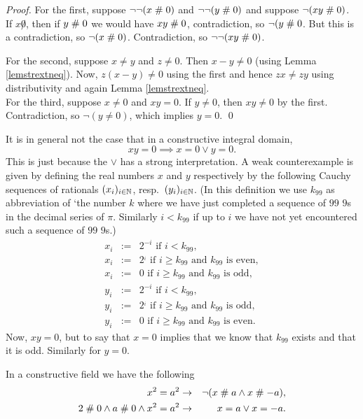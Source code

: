 \begin{proof}
For the first, suppose $\neg\neg(x\mathrel{\#} 0)$ and $\neg\neg(y\mathrel{\#} 0)$
and suppose $\neg(x y\mathrel{\#} 0)$. If $x\not 0$, then if $y\mathrel{\#} 0$ we
would have $x y \mathrel{\#} 0$, contradiction, so $\neg(y\mathrel{\#} 0$. But this
is a contradiction, so $\neg(x\mathrel{\#} 0)$. Contradiction, so 
$\neg\neg(x y\mathrel{\#} 0)$.

For the second, suppose $x\neq y$ and $z\neq 0$. Then $x-y \neq 0$
(using Lemma \ref{lemstrextneq}). Now, $z (x-y) \neq 0$ using the
first and hence $z x \neq z y$ using distributivity and again Lemma
\ref{lemstrextneq}.\\ For the third, suppose $x\neq 0$ and $x y=0$. If
$y\neq 0$, then $x y \neq 0$ by the first. Contradiction, so
$\neg(y\neq 0)$, which implies $y=0$. \qed
\end{proof}

\begin{remark}
  It is in general not the case that in a constructive integral
  domain,
$$xy = 0 \implies x =0 \vee y =0.$$
This is just because the $\vee$ has a strong interpretation. A weak
counterexample is given by defining the real numbers $x$ and $y$
respectively by the following Cauchy sequences of rationals
$(x_i)_{i\in\mathbb{N}}$, resp.\ $(y_i)_{i\in\mathbb{N}}$.
(In this definition we use  $k_{99}$ as abbreviation of `the number
$k$ where we have just completed a sequence of 
$99$ $9$s in the decimal series of $\pi$. Similarly $i<k_{99}$ if up
to $i$ we have not yet encountered such a sequence of $99$ $9$s.)
\begin{eqnarray*}
  x_i &:=& 2^{-i} \mbox{ if } i<k_{99},\\
  x_i &:=& 2^{_i} \mbox{ if } i\geq k_{99} \mbox{ and } k_{99} \mbox{ is
  even},\\
  x_i &:=& 0 \mbox{ if } i\geq k_{99} \mbox{ and } k_{99} \mbox{ is
  odd},\\
  y_i &:=& 2^{-i} \mbox{ if } i<k_99,\\
  y_i &:=& 2^{_i} \mbox{ if } i\geq k_{99} \mbox{ and } k_{99} \mbox{ is
  odd},\\
  y_i &:=& 0 \mbox{ if } i\geq k_{99} \mbox{ and } k_{99} \mbox{ is
  even}.
\end{eqnarray*}
Now, $xy = 0$, but to say that $x=0$ implies that we know that $k_{99}$
exists and that it is odd. Similarly for $y=0$.
\end{remark}


\begin{lemma}\label{lemidsqu}
In a constructive field we have the following
  \begin{eqnarray*}
    x^2 = a^2 &\rightarrow& \neg(x\mathrel{\#} a \wedge x\mathrel{\#} -a),\\
2\mathrel{\#} 0\wedge a\mathrel{\#} 0\wedge x^2 = a^2 &\rightarrow& x= a \vee x= -a.\\
  \end{eqnarray*}
\end{lemma}

